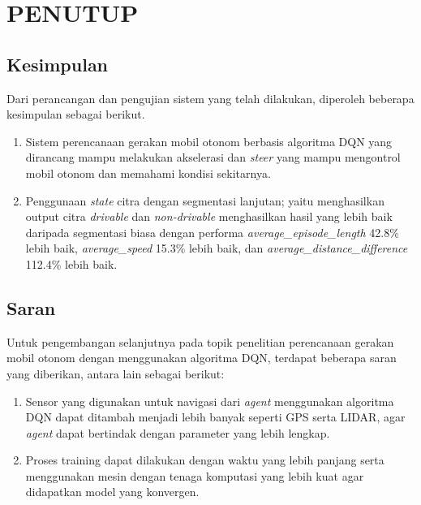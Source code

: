 \chapter{PENUTUP}
\label{chap:penutup}


\section{Kesimpulan}
\label{sec:kesimpulan}

Dari perancangan dan pengujian sistem yang telah dilakukan, diperoleh beberapa kesimpulan sebagai berikut. 

\begin{enumerate}[nolistsep]

  \item Sistem perencanaan gerakan mobil otonom berbasis algoritma DQN yang dirancang mampu melakukan akselerasi dan \textit{steer} yang mampu mengontrol mobil otonom dan memahami kondisi sekitarnya.

  \item Penggunaan \textit{state } citra dengan segmentasi lanjutan; yaitu menghasilkan output citra \textit{drivable }dan \textit{non-drivable} menghasilkan hasil yang lebih baik daripada segmentasi biasa dengan performa \textit{average\_episode\_length} 42.8\% lebih baik, \textit{average\_speed} 15.3\% lebih baik, dan \textit{average\_distance\_difference} 112.4\% lebih baik.

\end{enumerate}

\section{Saran}
\label{chap:saran}

Untuk pengembangan selanjutnya pada topik penelitian perencanaan gerakan mobil otonom dengan menggunakan algoritma DQN, terdapat beberapa saran yang diberikan, antara lain sebagai berikut:

\begin{enumerate}[nolistsep]

  \item Sensor yang digunakan untuk navigasi dari \textit{agent }menggunakan algoritma DQN dapat ditambah menjadi lebih banyak seperti GPS serta LIDAR, agar \textit{agent} dapat bertindak dengan parameter yang lebih lengkap.

  \item Proses training dapat dilakukan dengan waktu yang lebih panjang serta menggunakan mesin dengan tenaga komputasi yang lebih kuat agar didapatkan model yang konvergen.

  \iffalse
  \item Memperbaiki sistem award, dimana sebaiknya memikirkan sudut kendaraan terhadap pusat bundaran, serta jarak kendaraan terhadap bagian tengah jalan.

  \item Membuat tolak ukur metrik yang memadai untuk bagian pengujian model berupa plot riwayat gerakan kendaraan serta plot kecepatan kendaraan.
  \fi

\end{enumerate}
